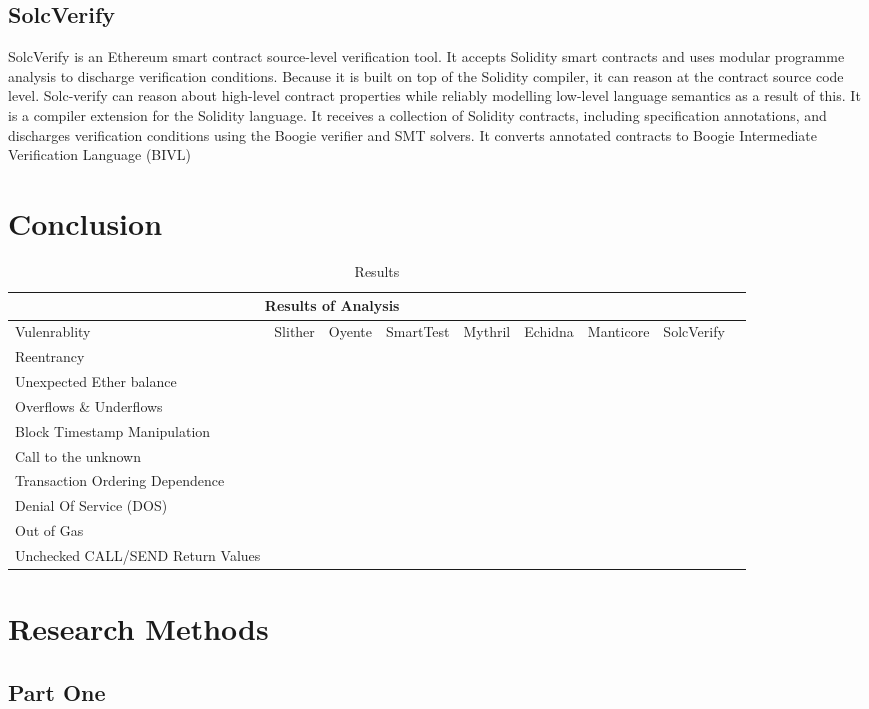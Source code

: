 \documentclass[a4paper,sigconf, language=french,
language=german, language=spanish, language=english]{acmart}
\begin{document}
\subsection{SolcVerify} SolcVerify is an Ethereum smart contract source-level verification tool.
It accepts Solidity smart contracts and uses modular programme analysis to discharge verification conditions.
Because it is built on top of the Solidity compiler, it can reason at the contract source code level.
Solc-verify can reason about high-level contract properties while reliably modelling low-level language semantics as a result of this.
It is a compiler extension for the Solidity language.
It receives a collection of Solidity contracts, including specification annotations, and discharges verification conditions using the Boogie verifier and SMT solvers.
It converts annotated contracts to Boogie Intermediate Verification Language (BIVL)
 
\section{Conclusion}
\label{Conclusion}

\begin{table*}
  \caption{Results}
  \label{Results}
  \begin{tabular}{ |p{2cm}||p{1cm}|p{2cm}| p{2cm} |p{1cm}|p{2cm}|p{2cm}| p{1cm}|p{2cm}}
  \hline
  \multicolumn{7}{|c|}{Results of Analysis} \\
  \hline
  Vulenrablity & Slither & Oyente & SmartTest & Mythril & Echidna & Manticore & SolcVerify \\
  \hline
  Reentrancy & &&&&&&\\
  \hline
  Unexpected Ether balance && &&&&& \\
  \hline
  Overflows \& Underflows & &&&&&& \\
  \hline
  Block Timestamp Manipulation && &&&&& \\
  \hline
  Call to the unknown & &&&&&&\\
  \hline
  Transaction Ordering Dependence & &&&&&& \\
  \hline
  Denial Of Service (DOS) & &&&&&&\\
  \hline
  Out of Gas & &&&&&& \\
  \hline
  Unchecked CALL/SEND Return Values& &&&&&&\\
  \hline
  \end{tabular}
\end{table*}
\begin{acks}

\end{acks}




\appendix

\section{Research Methods}

\subsection{Part One}
\end{document}
